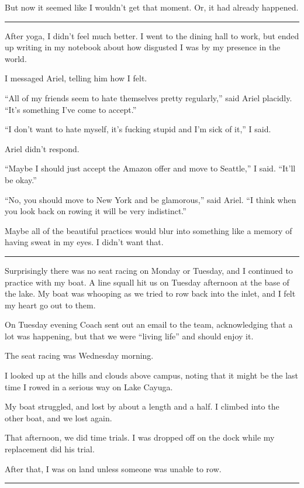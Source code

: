 But now it seemed like I wouldn't get that moment.  Or, it had already happened.

\plainfancybreak{12pt}{2}{}

After yoga, I didn't feel much better.  I went to the dining hall to work, but
ended up writing in my notebook about how disgusted I was by my presence in the
world.

I messaged Ariel, telling him how I felt.

``All of my friends seem to hate themselves pretty regularly,'' said Ariel
placidly.  ``It's something I've come to accept.''

``I don't want to hate myself, it's fucking stupid and I'm sick of it,'' I said.  

Ariel didn't respond.

``Maybe I should just accept the Amazon offer and move to Seattle,'' I said.
``It'll be okay.''

``No, you should move to New York and be glamorous,'' said Ariel.  ``I think
when you look back on rowing it will be very indistinct.'' 

Maybe all of the beautiful practices would blur into something like a memory of
having sweat in my eyes.  I didn't want that.

\plainfancybreak{12pt}{2}{}

Surprisingly there was no seat racing on Monday or Tuesday, and I continued to
practice with my boat.  A line squall hit us on Tuesday afternoon at the base of
the lake.  My boat was whooping as we tried to row back into the inlet, and I
felt my heart go out to them.

On Tuesday evening Coach sent out an email to the team,  acknowledging that a
lot was happening, but that we were ``living life'' and should enjoy it.

The seat racing was Wednesday morning.  

I looked up at the hills and clouds above campus, noting that it might be the
last time I rowed in a serious way on Lake Cayuga.

My boat struggled, and lost by about a length and a half.  I climbed into the
other boat, and we lost again.

That afternoon, we did time trials.  I was dropped off on the dock while my
replacement did his trial. 

After that, I was on land unless someone was unable to row.
 
\plainfancybreak{12pt}{2}{}

